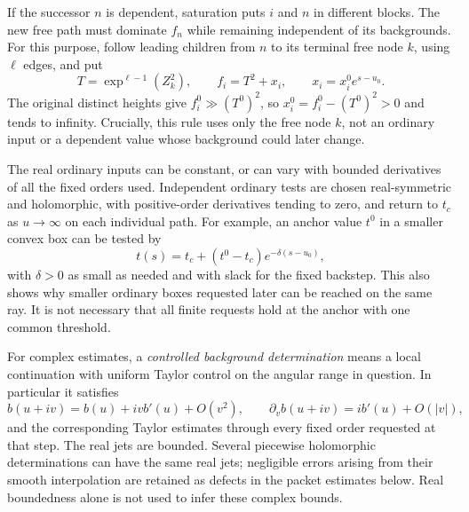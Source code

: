 If the successor $n$ is dependent, saturation puts $i$ and $n$ in
different blocks. The new free path must dominate $f_n$ while remaining
independent of its backgrounds. For this purpose, follow leading children
from $n$ to its terminal free node
$k$, using $\ell$ edges, and put
\begin{equation}\label{eq:flags-boundary}
 T=\exp^{\ell-1}(Z_k^2),\qquad
 f_i=T^2+x_i,\qquad x_i=x_i^0e^{s-u_0}.
\end{equation}
The original distinct heights give $f_i^0\gg (T^0)^2$, so
$x_i^0=f_i^0-(T^0)^2>0$ and tends to infinity. Crucially, this rule
uses only the free node $k$, not an ordinary input or a dependent
value whose background could later change.

The real ordinary inputs can be constant, or can vary with bounded
derivatives of all the fixed orders used. Independent ordinary tests
are chosen real-symmetric and holomorphic, with positive-order
derivatives tending to zero, and return to $t_c$ as $u\to\infty$
on each individual path. For example, an anchor value $t^0$ in a
smaller convex box can be tested by
\[
 t(s)=t_c+(t^0-t_c)e^{-\delta(s-u_0)},
\]
with $\delta>0$ as small as needed and with slack for the fixed
backstep. This also shows why smaller ordinary boxes requested later
can be reached on the same ray. It is not necessary that all finite
requests hold at the anchor with one common threshold.

For complex estimates, a \emph{controlled background determination}
means a local continuation with uniform Taylor control on the angular
range in question. In particular it satisfies
\[
 b(u+iv)=b(u)+ivb'(u)+O(v^2),\qquad
 \partial_v b(u+iv)=ib'(u)+O(|v|),
\]
and the corresponding Taylor estimates through every fixed order
requested at that step. The real jets are bounded. Several piecewise
holomorphic determinations can have the same real jets; negligible
errors arising from their smooth interpolation are retained as defects
in the packet estimates below. Real boundedness alone is not used to
infer these complex bounds.

